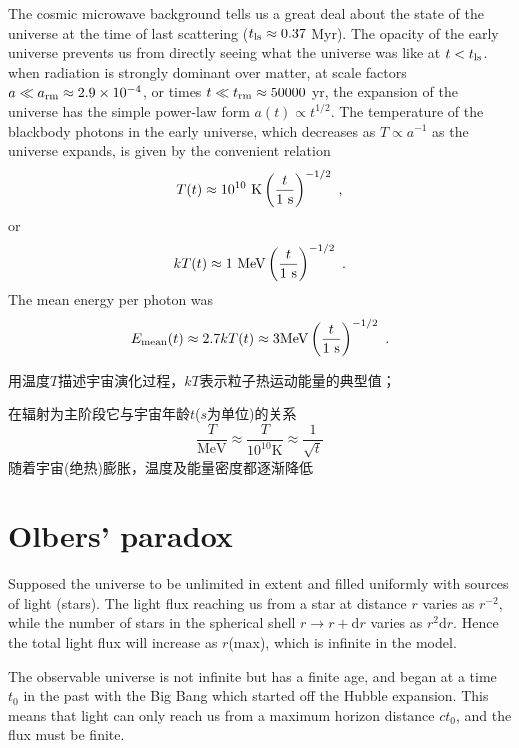 \documentclass[12pt,a4paper]{article}
\newcommand{\dif}{\mathrm{d}}
\begin{document}
\cite{ryden2016introduction} The cosmic microwave background tells us a great deal about the state of the universe at the time of last scattering ($t_{\rm ls} \approx 0.37$ Myr). The opacity of the early universe prevents us from directly seeing what the universe was like at $t < t_{\rm ls}$. when radiation is strongly dominant over matter, at scale factors $a \ll a_{\rm rm} \approx 2.9 \times 10^{-4}$, or times $t \ll t_{\rm rm} \approx 50 000$ yr, the expansion of the universe has the simple power-law form $a(t) \propto t^{1/2}$. The temperature of the blackbody photons in the early universe, which decreases as $T \propto a^{-1}$ as the universe expands, is given by the convenient relation
\begin{equation}
T(t) \approx 10^{10}~ {\rm K} \left(\dfrac{t}{1~ \rm s} \right)^{-1/2} ~,
\end{equation}
or
\begin{equation}
k T(t) \approx 1~ {\rm MeV} \left(\dfrac{t}{1~ \rm s} \right)^{-1/2} ~.
\end{equation}
The mean energy per photon was
\begin{equation}
E_{\rm mean}(t) \approx 2.7 kT(t) \approx 3 {\rm MeV} \left(\dfrac{t}{1~ \rm s} \right)^{-1/2} ~.
\end{equation}

\cite{2012宇宙大尺度结构的形成} 用温度$T$描述宇宙演化过程，$kT$表示粒子热运动能量的典型值；

在辐射为主阶段它与宇宙年龄$t$($s$为单位)的关系
\begin{equation}
\frac{T}{\text{MeV}} \approx \frac{T}{10^{10} \text{K}} \approx \frac{1}{\sqrt{t}}
\end{equation}
随着宇宙(绝热)膨胀，温度及能量密度都逐渐降低



\cite{cheng2005relativity}

\section{Olbers' paradox} 
\cite{perkins2008particle} Supposed the universe to be unlimited in extent and filled uniformly with sources of light (stars). The light flux reaching us from a star at distance $r$ varies as $r^{-2}$, while the number of stars in the spherical shell $r \rightarrow r +\dif r$ varies as $r^2 \dif r$. Hence the total light flux will increase as $r$(max), which is infinite in the model.

The observable universe is not infinite but has a finite age, and began at a time $t_0$ in the past with the Big Bang which started off the Hubble expansion. This means that light can only reach us from a maximum horizon distance $c t_0$, and the flux must be finite.
\end{document}
